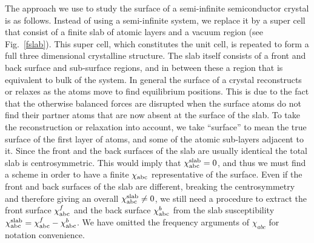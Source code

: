 \documentclass[floatfix,prb,aps,superscriptaddress,11pt,preprint,letterpaper]{revtex4}
\begin{document}
The approach we use to study the surface of a semi-infinite
semiconductor crystal is as follows. Instead of using a
semi-infinite system, we replace it by a super cell that consist of a finite
slab of atomic layers and a vacuum region (see Fig.~\ref{fslab}). This
super cell, which constitutes the unit cell,
is repeated to form a full three dimensional crystalline structure.
The slab itself consists of a front and back surface and sub-surface regions, and in between these
a region that is equivalent to
bulk of the system. 
In general the surface of a crystal reconstructs or relaxes as the atoms
move to find equilibrium positions. This is due to the fact that
the otherwise
balanced forces are disrupted when the surface atoms do not find their 
partner atoms that are now absent at the surface of the slab. 
To take the reconstruction or relaxation into account, we take ``surface'' to mean
the true surface of the first layer of atoms, and
some of the atomic sub-layers adjacent to it.
Since the front and the back
surfaces of the slab are usually identical the total slab is
centrosymmetric. This would imply that 
$\chi^{\mathrm{slab}}_{\mathrm{a}\mathrm{b}\mathrm{c}}=0$, and thus we must
find a scheme 
in order to have a finite $\chi_{\mathrm{a}\mathrm{b}\mathrm{c}}$ representative of the
surface. Even if the front and back surfaces of the slab 
are different, breaking the centrosymmetry and therefore giving an
overall $\chi^{\mathrm{slab}}_{\mathrm{a}\mathrm{b}\mathrm{c}}\ne 0$, we still
need a procedure to extract the front surface $\chi^f_{\mathrm{a}\mathrm{b}\mathrm{c}}$
and the back surface $\chi^b_{\mathrm{a}\mathrm{b}\mathrm{c}}$ from the slab
susceptibility 
$\chi^{\mathrm{slab}}_{\mathrm{a}\mathrm{b}\mathrm{c}}=\chi^f_{\mathrm{a}\mathrm{b}\mathrm{c}}-\chi^b_{\mathrm{a}\mathrm{b}\mathrm{c}}$.
We have omitted the frequency arguments of $\chi_{abc}$ for notation convenience. 
\end{document}
